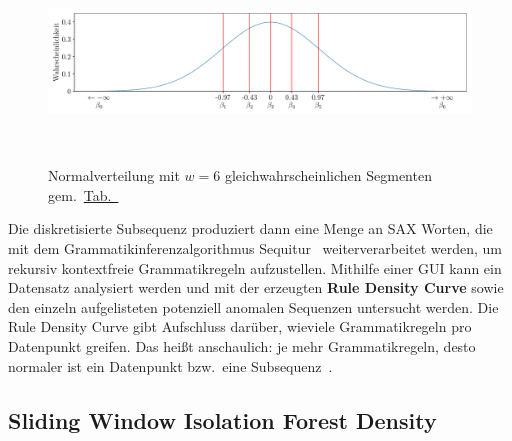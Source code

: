 \begin{figure}[t!]
    \centering
        \includegraphics[width=\linewidth]{ch4_anomalien/abbildungen/normalverteilung_SAX_segmente.pdf}
    \caption{Normalverteilung mit $w=6$ gleichwahrscheinlichen Segmenten gem.~\hyperref[tab:normalverteilung_segmente]{Tab.~}}
~\label{fig:normalverteilung_segmente}
\end{figure}

Die diskretisierte Subsequenz produziert dann eine Menge an SAX Worten, die mit dem Grammatikinferenzalgorithmus Sequitur~\cite{NevillManning1997}
weiterverarbeitet werden, um rekursiv kontextfreie Grammatikregeln aufzustellen. Mithilfe einer GUI kann ein Datensatz analysiert werden und mit der
erzeugten \textbf{Rule Density Curve} sowie den einzeln aufgelisteten potenziell anomalen Sequenzen untersucht werden. Die Rule Density Curve gibt Aufschluss
darüber, wieviele Grammatikregeln pro Datenpunkt greifen. Das heißt anschaulich: je mehr Grammatikregeln, desto normaler ist ein Datenpunkt bzw.~eine
Subsequenz~\cite{senin-gv2}.

\subsection{Sliding Window Isolation Forest Density}
\label{subsec:swifd}


